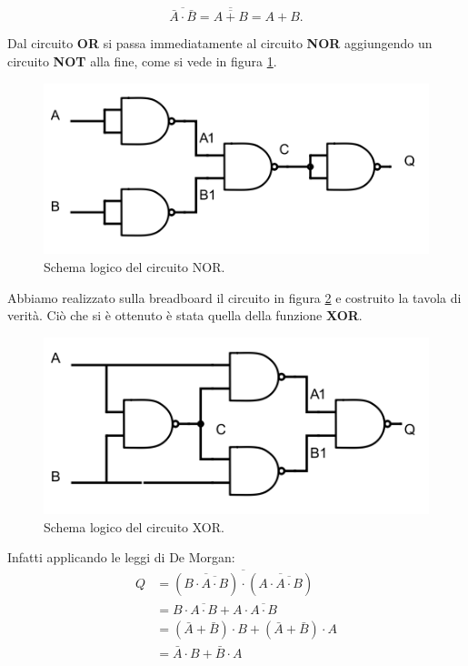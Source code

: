 \documentclass[journal, a4paper]{IEEEtran}
\begin{document}
\begin{equation}
\overline{\bar{A} \cdot \bar{B}} = \overline{\overline{A + B}} = A + B.
\end{equation}

Dal circuito \textbf{OR} si passa immediatamente al circuito \textbf{NOR} aggiungendo un circuito \textbf{NOT} alla fine, come si vede in figura \ref{fig:nor}.

\begin{figure}[htp]
\centering
\includegraphics[scale=.5]{nor}
\caption{Schema logico del circuito NOR.}
\label{fig:nor}
\end{figure}

Abbiamo realizzato sulla breadboard il circuito in figura \ref{fig:xor} e costruito la tavola di verità. Ciò che si è ottenuto è stata quella della funzione \textbf{XOR}.

\begin{figure}[htp]
\centering
\includegraphics[scale=.5]{xor}
\caption{Schema logico del circuito XOR.}
\label{fig:xor}
\end{figure}

Infatti applicando le leggi di De Morgan:
\begin{equation}
\begin{split}
Q & = \overline{(\overline{B \cdot \overline{A \cdot B}})\cdot (\overline{A \cdot \overline{A \cdot B}})} \\
  & = B \cdot \overline{A \cdot B} + A \cdot \overline{A \cdot B} \\
  & =(\bar{A} + \bar{B})\cdot B + (\bar{A} + \bar{B})\cdot A \\
  & = \bar{A}\cdot B + \bar{B} \cdot A \\
\end{split}
\end{equation}
\end{document}
